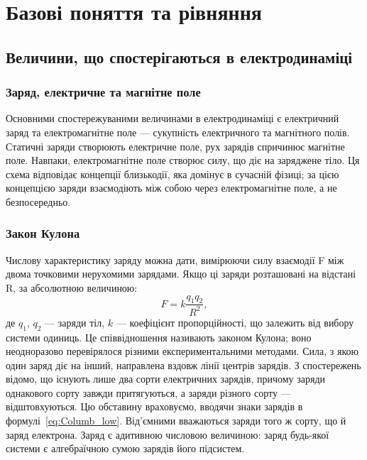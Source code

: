 
\chapter{Базові поняття та рівняння}\label{\currfilebase}

\section{Величини, що спостерігаються в електродинаміці}

\subsection*{Заряд, електричне та магнітне поле}


Основними спостережуваними величинами в електродинаміці є
електричний заряд та електромагнітне поле --- сукупність електричного та
магнітного полів. Статичні заряди створюють електричне поле, рух зарядів
спричинює магнітне поле. Навпаки, електромагнітне поле створює силу, що діє
на заряджене тіло. Ця схема відповідає концепції близькодії, яка домінує в
сучасній фізиці; за цією концепцією заряди взаємодіють між собою через
електромагнітне поле, а не безпосередньо.

\subsection*{Закон Кулона}

Числову характеристику заряду можна дати, вимірюючи
силу взаємодії F між двома точковими нерухомими зарядами. Якщо ці заряди
розташовані на відстані R, за абсолютною величиною:
\begin{equation}\label{eq:Columb_low}
    F = k \frac{q_1q_2}{R^2},
\end{equation}
де $q_1$, $q_2$ --- заряди тіл, $k$ --- коефіцієнт пропорційності, що залежить від вибору
системи одиниць. Це співвідношення називають законом Кулона; воно
неодноразово перевірялося різними експериментальними методами. Сила, з
якою один заряд діє на інший, направлена вздовж лінії центрів зарядів.
З спостережень відомо, що існують лише два сорти електричних зарядів,
причому заряди однакового сорту завжди притягуються, а заряди різного сорту
— відштовхуються. Цю обставину враховуємо, вводячи знаки зарядів в
формулі~\eqref{eq:Columb_low}. Від'ємними вважаються заряди того ж сорту, що й заряд
електрона. Заряд є адитивною числовою величиною: заряд будь-якої
системи є алгебраїчною сумою зарядів його підсистем.

